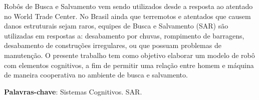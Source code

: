 \documentclass[
	article,			%
	11pt,				%
	oneside,			%
	a4paper,			%
	english,			%
	brazil,				%
	sumario=tradicional	
	]{abntex2}
\begin{document}

\frenchspacing 


%
%

\maketitle





\begin{resumoumacoluna}
Robôs de Busca e Salvamento vem sendo utilizados desde a resposta ao atentado no World Trade Center. No Brasil ainda que terremotos e atentados que causem danos estruturais sejam raros, equipes de Busca e Salvamento (SAR) são utilizadas em respostas a: desabamento por chuvas, rompimento de barragens, desabamento de construções irregulares, ou que possuam problemas de manutenção. O presente trabalho tem como objetivo elaborar um modelo de robô com elementos cognitivos, a fim de permitir uma relação entre homem e máquina de maneira cooperativa no ambiente de busca e salvamento. 
 
 \vspace{\onelineskip}
 
 \noindent
 \textbf{Palavras-chave}: Sistemas Cognitivos. SAR. 
\end{resumoumacoluna}


%
% 
\end{document}

